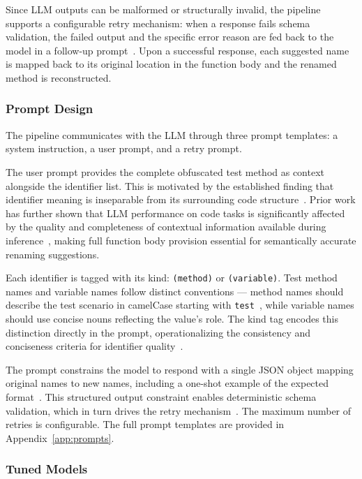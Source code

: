 \documentclass[conference]{IEEEtran}
\begin{document}
Since LLM outputs can be malformed or structurally invalid, the pipeline
supports a configurable retry mechanism: when a response fails schema
validation, the failed output and the specific error reason are fed back to the
model in a follow-up
prompt~\cite{shinn2023reflexion,ravi2025llmloop,jiang2026reflexicoder}.
Upon a successful response, each suggested name is mapped back to its original
location in the function body and the renamed method is reconstructed.

\subsubsection{Prompt Design}

The pipeline communicates with the LLM through three prompt templates: a system
instruction, a user prompt, and a retry prompt.

The user prompt provides the complete obfuscated test method as context
alongside the identifier list. This is motivated by the established finding
that identifier meaning is inseparable from its surrounding code
structure~\cite{allamanis2018learning}.
Prior work has further shown that LLM performance on code tasks is significantly
affected by the quality and completeness of contextual information available
during inference~\cite{wang2024naming}, making full function body provision
essential for semantically accurate renaming suggestions.

Each identifier is tagged with its kind: \texttt{(method)} or
\texttt{(variable)}.
Test method names and variable names follow distinct conventions --- method
names should describe the test scenario in camelCase starting with
\texttt{test}~\cite{daka2017generating}, while variable names should use
concise nouns reflecting the value's role.
The kind tag encodes this distinction directly in the prompt, operationalizing
the consistency and conciseness criteria for identifier
quality~\cite{dekeersmaeker2024enhancing}.

The prompt constrains the model to respond with a single JSON object mapping
original names to new names, including a one-shot example of the expected
format~\cite{brown2020gpt3}.
This structured output constraint enables deterministic schema validation, which
in turn drives the retry mechanism~\cite{shinn2023reflexion,ravi2025llmloop,jiang2026reflexicoder}.
The maximum number of retries is configurable.
The full prompt templates are provided in Appendix~\ref{app:prompts}.

\subsubsection{Tuned Models}
\end{document}
